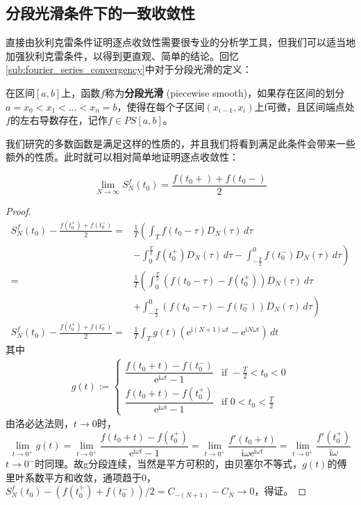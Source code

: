 \documentclass{ctexbook}
\begin{document}
\subsection{分段光滑条件下的一致收敛性}\label{sub:uniform_converge}
直接由狄利克雷条件证明逐点收敛性需要很专业的分析学工具，但我们可以适当地加强狄利克雷条件，以得到更直观、简单的结论\cite{folland}。回忆\ref{sub:fourier_series_convergency}中对于分段光滑的定义：
\begin{definition}[分段光滑]
在区间$[a,b]$上，函数$f$称为\textbf{分段光滑} (piecewise smooth)，如果存在区间的划分$a=x_0<x_1<\dots <x_n=b$，使得在每个子区间$(x_{i-1},x_i)$上f可微，且区间端点处$f$的左右导数存在，记作$f\in PS[a,b]$。
\end{definition}
我们研究的多数函数是满足这样的性质的，并且我们将看到满足此条件会带来一些额外的性质。此时就可以相对简单地证明逐点收敛性：
\begin{theorem}[傅里叶级数的逐点收敛性]
    \[\lim_{N\to\infty}S_N^f(t_0)=\frac{f(t_0+)+f(t_0-)}{2}\]
\end{theorem}
\begin{proof}
\begin{align*}
    S_N^f(t_0)-\frac{f(t_0^+)+f(t_0^-)}{2} =&\frac{1}{T}\left(\int_{T}f(t_0-\tau)D_N(\tau)\,d\tau\right.\\
    &\left.-\int_{0}^{\frac{T}{2}}f(t_0^+)D_N(\tau)\,d\tau-\int_{-\frac{T}{2}}^{0}f(t_0^-)D_N(\tau)\,d\tau\right)\\
    =&\frac{1}{T}\left(\int_{0}^{\frac{T}{2}}(f(t_0-\tau)-f(t_0^+))D_N(\tau)\,d\tau\right.\\
    &+\left.\int_{-\frac{T}{2}}^{0}(f(t_0-\tau)-f(t_0^-))D_N(\tau)\,d\tau\right)\\
    S_N^f(t_0)-\frac{f(t_0^+)+f(t_0^-)}{2}=&\frac{1}{T}\int_{T}g(t)\left(\mathrm{e}^{\mathrm{i}(N+1)\omega t}-\mathrm{e}^{\mathrm{i}N\omega t}\right)\,dt                            
\end{align*}
其中\begin{align*}
g(t):=\begin{cases}
\dfrac{f(t_0+t)-f(t_0^-)}{\mathrm{e}^{\mathrm{i}\omega t}-1} & \text{if }-\frac{T}{2}<t_0<0 \\
\dfrac{f(t_0+t)-f(t_0^+)}{\mathrm{e}^{\mathrm{i}\omega t}-1} & \text{if }0<t_0<\frac{T}{2}
\end{cases}
\end{align*}                        
由洛必达法则，$t\to 0$时，\[\lim_{t\to 0^+}g(t)=\lim_{t\to 0^+}\frac{f(t_0+t)-f(t_0^+)}{\mathrm{e}^{\mathrm{i}\omega t}-1}=\lim_{t\to 0^+}\frac{f'(t_0+t)}{\mathrm{i}\omega \mathrm{e}^{\mathrm{i}\omega t}}=\lim_{t\to 0^+}\frac{f'(t_0^+)}{\mathrm{i}\omega}\]
$t\to 0^-$时同理。故g分段连续，当然是平方可积的，由贝塞尔不等式，$g(t)$的傅里叶系数平方和收敛，通项趋于0，$S_N^f(t_0)-\left(f(t_0^+)+f(t_0^-)\right)/2=C_{-(N+1)}-C_N\to 0$，得证。
\end{proof}
\end{document}
